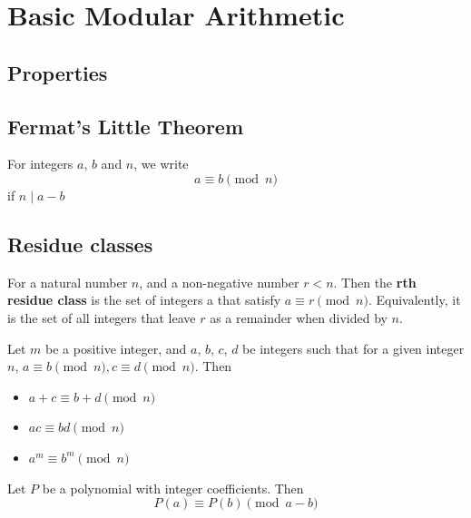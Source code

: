 \chapter{Basic Modular Arithmetic}
\section{Properties}
\section{Fermat's Little Theorem}

\begin{theorem}
\end{theorem}

\begin{definition}
    For integers $a$, $b$ and $n$, we write
    \[a \equiv b \pmod n\]
    if $n \mid a-b$
\end{definition}

\section{Residue classes}

\begin{definition}
    For a natural number $n$, and a non-negative number $r < n$. Then the
\textbf{rth residue class} is the set of integers a that satisfy $a \equiv r \pmod n$. Equivalently, it is the
set of all integers that leave $r$ as a remainder when divided by $n$.
\end{definition}

\begin{theorem}
    Let $m$ be a positive integer, and $a$, $b$, $c$, $d$ be integers such that for a given integer $n$, $a \equiv b \pmod n, c \equiv d \pmod n$. Then 

    \begin{itemize}
       \item $a+c \equiv b+d \pmod n$ 
       \item $ac \equiv bd \pmod n$
       \item $a^m \equiv b^m \pmod n$
    \end{itemize}

\end{theorem}

\begin{lemma}
    Let $P$ be a polynomial with integer coefficients. Then
    \[ P(a) \equiv P(b) \pmod {a-b}\]
\end{lemma}

